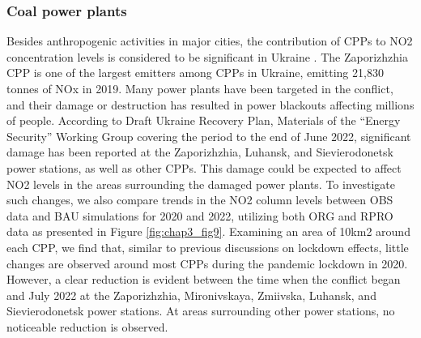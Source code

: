 \subsubsection*{Coal power plants}
Besides anthropogenic activities in major cities, the contribution of CPPs to NO2 concentration levels is considered to be significant in Ukraine \citep{lauri2021}. The Zaporizhzhia CPP is one of the largest emitters among CPPs in Ukraine, emitting 21,830 tonnes of NOx in 2019. Many power plants have been targeted in the conflict, and their damage or destruction has resulted in power blackouts affecting millions of people. According to Draft Ukraine Recovery Plan, Materials of the “Energy Security” Working Group covering the period to the end of June 2022, significant damage has been reported at the Zaporizhzhia, Luhansk, and Sievierodonetsk power stations, as well as other CPPs. This damage could be expected to affect NO2 levels in the areas surrounding the damaged power plants. To investigate such changes, we also compare trends in the NO2 column levels between OBS data and BAU simulations for 2020 and 2022, utilizing both ORG and RPRO data as presented in Figure \ref{fig:chap3_fig9}. Examining an area of 10km2 around each CPP, we find that, similar to previous discussions on lockdown effects, little changes are observed around most CPPs during the pandemic lockdown in 2020. However, a clear reduction is evident between the time when the conflict began and July 2022 at the Zaporizhzhia, Mironivskaya, Zmiivska, Luhansk, and Sievierodonetsk power stations. At areas surrounding other power stations, no noticeable reduction is observed.\par
